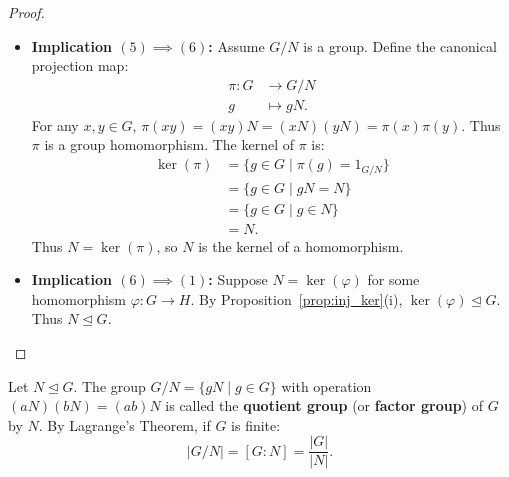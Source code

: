 \begin{proof}
\begin{itemize}[leftmargin=1.5em, itemsep=6pt]
    \emph{Group Axioms for $G/N$:}
    \begin{enumerate}[label=\alph*., leftmargin=*]
        \item \emph{Associativity:} For all $aN, bN, cN \in G/N$:
        \begin{align*}
        \bigl((aN)(bN)\bigr)(cN) &= \bigl((ab)N\bigr)(cN) = \bigl((ab)c\bigr)N \\
        &= \bigl(a(bc)\bigr)N = (aN)\bigl((bc)N\bigr) = (aN)\bigl((bN)(cN)\bigr).
        \end{align*}
        \item \emph{Identity:} $(1_G N)(aN) = (1_G a)N = aN = (a \cdot 1_G)N = (aN)(1_G N)$. Thus $1_G N = N$ is the identity element.
        \item \emph{Inverses:} For any $aN \in G/N$, $(a^{-1}N)(aN) = (a^{-1}a)N = N = (a a^{-1})N = (aN)(a^{-1}N)$. Thus $(aN)^{-1} = a^{-1}N$.
    \end{enumerate}
    Thus $G/N$ is a group.

    \item \textbf{Implication $(5) \implies (6)$:}
    Assume $G/N$ is a group. Define the canonical projection map:
    \begin{align*}
    \pi: G &\longrightarrow G/N \\
    g &\longmapsto gN.
    \end{align*}
    For any $x, y \in G$, $\pi(xy) = (xy)N = (xN)(yN) = \pi(x)\pi(y)$.
    Thus $\pi$ is a group homomorphism.
    The kernel of $\pi$ is:
    \begin{align*}
    \ker(\pi) &= \{ g \in G \mid \pi(g) = 1_{G/N} \} \\
    &= \{ g \in G \mid gN = N \} \\
    &= \{ g \in G \mid g \in N \} \\
    &= N.
    \end{align*}
    Thus $N = \ker(\pi)$, so $N$ is the kernel of a homomorphism.

    \item \textbf{Implication $(6) \implies (1)$:}
    Suppose $N = \ker(\varphi)$ for some homomorphism $\varphi: G \to H$.
    By Proposition~\ref{prop:inj_ker}(i), $\ker(\varphi) \trianglelefteq G$.
    Thus $N \trianglelefteq G$.
\end{itemize}
\end{proof}

\begin{definition}
Let $N \trianglelefteq G$. The group $G/N = \{ gN \mid g \in G \}$ with operation $(aN)(bN) = (ab)N$ is called the \textbf{quotient group} (or \textbf{factor group}) of $G$ by $N$.
By Lagrange's Theorem, if $G$ is finite:
\begin{equation}
|G/N| = [G : N] = \frac{|G|}{|N|}.
\end{equation}
\end{definition}

